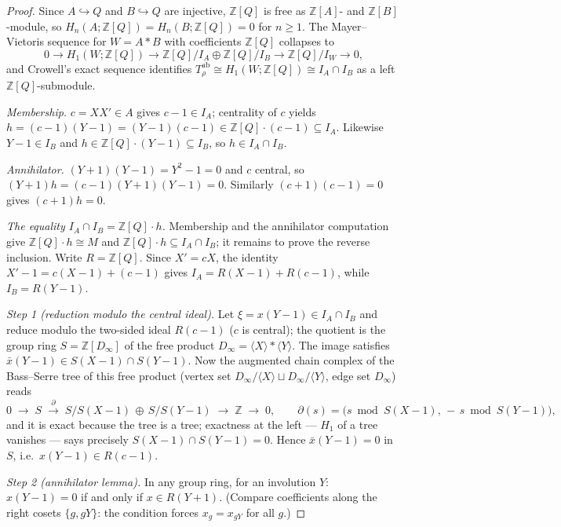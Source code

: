 \documentclass[11pt,a4paper]{article}
\theoremstyle{remark}
\theoremstyle{plain}
\begin{document}
\begin{proof}
Since $A \hookrightarrow Q$ and $B \hookrightarrow Q$ are injective,
$\mathbb{Z}[Q]$ is free as $\mathbb{Z}[A]$- and $\mathbb{Z}[B]$-module,
so $H_n(A; \mathbb{Z}[Q]) = H_n(B; \mathbb{Z}[Q]) = 0$ for $n \ge 1$.
The Mayer--Vietoris sequence for $W = A * B$ with coefficients
$\mathbb{Z}[Q]$ collapses to
\[
0 \to H_1(W; \mathbb{Z}[Q])
   \to \mathbb{Z}[Q]/I_A \oplus \mathbb{Z}[Q]/I_B
   \to \mathbb{Z}[Q]/I_W \to 0,
\]
and Crowell's exact sequence identifies
$T_\rho^{\mathrm{ab}} \cong H_1(W; \mathbb{Z}[Q]) \cong I_A \cap I_B$
as a left $\mathbb{Z}[Q]$-submodule.

\emph{Membership.}  $c = XX' \in A$ gives $c - 1 \in I_A$; centrality
of $c$ yields $h = (c-1)(Y-1) = (Y-1)(c-1) \in \mathbb{Z}[Q]\cdot(c-1)
\subseteq I_A$.  Likewise $Y - 1 \in I_B$ and
$h \in \mathbb{Z}[Q]\cdot(Y-1) \subseteq I_B$, so $h \in I_A \cap I_B$.

\emph{Annihilator.}  $(Y+1)(Y-1) = Y^2 - 1 = 0$ and $c$ central, so
$(Y+1) h = (c-1)(Y+1)(Y-1) = 0$.  Similarly $(c+1)(c-1) = 0$ gives
$(c+1) h = 0$.

\emph{The equality $I_A \cap I_B = \mathbb{Z}[Q]\cdot h$.}
Membership and the annihilator computation give
$\mathbb{Z}[Q]\cdot h \cong M$ and
$\mathbb{Z}[Q]\cdot h \subseteq I_A \cap I_B$; it remains to prove
the reverse inclusion.  Write $R = \mathbb{Z}[Q]$.  Since $X' = cX$,
the identity $X' - 1 = c(X-1) + (c-1)$ gives
$I_A = R(X-1) + R(c-1)$, while $I_B = R(Y-1)$.

\emph{Step 1 (reduction modulo the central ideal).}  Let
$\xi = x(Y-1) \in I_A \cap I_B$ and reduce modulo the two-sided
ideal $R(c-1)$ ($c$ is central); the quotient is the group ring
$S = \mathbb{Z}[D_\infty]$ of the free product
$D_\infty = \langle X \rangle * \langle Y \rangle$.  The image
satisfies $\bar x(Y-1) \in S(X-1) \cap S(Y-1)$.  Now the augmented
chain complex of the Bass--Serre tree of this free product (vertex set
$D_\infty/\langle X\rangle \sqcup D_\infty/\langle Y\rangle$,
edge set $D_\infty$) reads
\[
0 \;\to\; S \;\xrightarrow{\;\partial\;}\;
S/S(X-1) \,\oplus\, S/S(Y-1) \;\to\; \mathbb{Z} \;\to\; 0,
\qquad \partial(s) = \bigl(s \bmod S(X-1),\, -\,s \bmod
S(Y-1)\bigr),
\]
and it is exact because the tree is a tree; exactness at the left ---
$H_1$ of a tree vanishes --- says precisely
$S(X-1) \cap S(Y-1) = 0$.  Hence $\bar x (Y-1) = 0$ in $S$, i.e.\
$x(Y-1) \in R(c-1)$.

\emph{Step 2 (annihilator lemma).}  In any group ring, for an
involution $Y$: $x(Y-1) = 0$ if and only if $x \in R(Y+1)$.
(Compare coefficients along the right cosets $\{g, gY\}$: the
condition forces $x_g = x_{gY}$ for all $g$.)


\end{proof}
\end{document}
